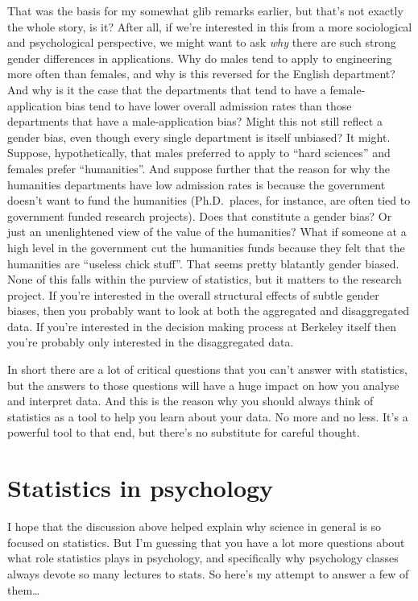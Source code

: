 \documentclass[
  a4paper,
]{book}
\begin{document}
That was the basis for my somewhat glib remarks earlier, but that's not
exactly the whole story, is it? After all, if we're interested in this
from a more sociological and psychological perspective, we might want to
ask \emph{why} there are such strong gender differences in applications.
Why do males tend to apply to engineering more often than females, and
why is this reversed for the English department? And why is it the case
that the departments that tend to have a female-application bias tend to
have lower overall admission rates than those departments that have a
male-application bias? Might this not still reflect a gender bias, even
though every single department is itself unbiased? It might. Suppose,
hypothetically, that males preferred to apply to ``hard sciences'' and
females prefer ``humanities''. And suppose further that the reason for
why the humanities departments have low admission rates is because the
government doesn't want to fund the humanities (Ph.D.~places, for
instance, are often tied to government funded research projects). Does
that constitute a gender bias? Or just an unenlightened view of the
value of the humanities? What if someone at a high level in the
government cut the humanities funds because they felt that the
humanities are ``useless chick stuff''. That seems pretty blatantly
gender biased. None of this falls within the purview of statistics, but
it matters to the research project. If you're interested in the overall
structural effects of subtle gender biases, then you probably want to
look at both the aggregated and disaggregated data. If you're interested
in the decision making process at Berkeley itself then you're probably
only interested in the disaggregated data.

In short there are a lot of critical questions that you can't answer
with statistics, but the answers to those questions will have a huge
impact on how you analyse and interpret data. And this is the reason why
you should always think of statistics as a tool to help you learn about
your data. No more and no less. It's a powerful tool to that end, but
there's no substitute for careful thought.

\hypertarget{statistics-in-psychology}{%
\section{Statistics in psychology}\label{statistics-in-psychology}}

I hope that the discussion above helped explain why science in general
is so focused on statistics. But I'm guessing that you have a lot more
questions about what role statistics plays in psychology, and
specifically why psychology classes always devote so many lectures to
stats. So here's my attempt to answer a few of them\ldots{}
\end{document}
